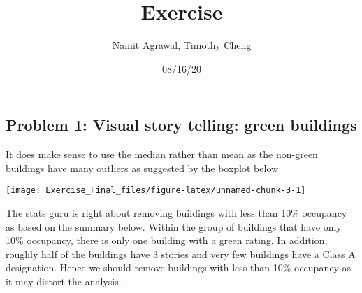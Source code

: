 \documentclass[
]{article}
\title{Exercise}
\author{Namit Agrawal, Timothy Cheng}
\date{08/16/20}
\begin{document}
\maketitle

\hypertarget{problem-1-visual-story-telling-green-buildings}{%
\subsection{\texorpdfstring{\textbf{Problem 1: Visual story telling:
green
buildings}}{Problem 1: Visual story telling: green buildings}}\label{problem-1-visual-story-telling-green-buildings}}

It does make sense to use the median rather than mean as the non-green
buildings have many outliers as suggested by the boxplot below

\begin{center}\texttt{[image: Exercise\_Final\_files/figure-latex/unnamed-chunk-3-1]} \end{center}

The stats guru is right about removing buildings with less than 10\%
occupancy as based on the summary below. Within the group of buildings
that have only 10\% occupancy, there is only one building with a green
rating. In addition, roughly half of the buildings have 3 stories and
very few buildings have a Class A designation. Hence we should remove
buildings with less than 10\% occupancy as it may distort the analysis.
\end{document}

